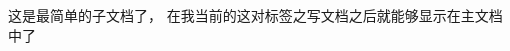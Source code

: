 \documentclass[../docment]{subfiles}
\begin{document}
	这是最简单的子文档了， 在我当前的这对标签之写文档之后就能够显示在主文档中了
\end{document}
